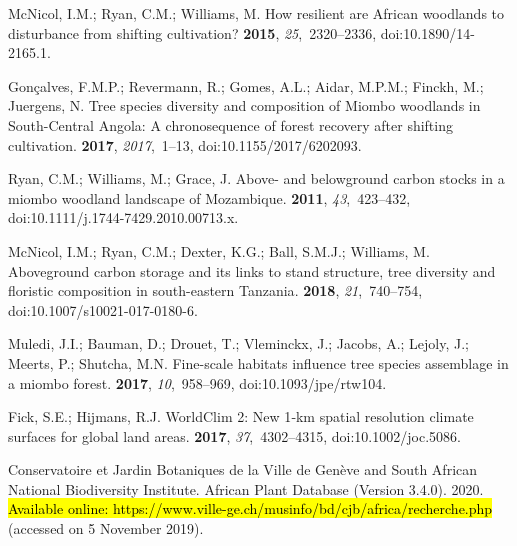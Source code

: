 \documentclass[diversity,article,accept,moreauthors,pdftex]{Definitions/mdpi}
\begin{document}
\begin{thebibliography}{999}
McNicol, I.M.; Ryan, C.M.; Williams, M.
\newblock How resilient are {African} woodlands to disturbance from shifting
  cultivation?
 {\bf 2015}, {\em 25},~2320--2336, doi:10.1890/14-2165.1.

Gon\c{c}alves, F.M.P.; Revermann, R.; Gomes, A.L.; Aidar, M.P.M.; Finckh, M.;
  Juergens, N.
\newblock Tree species diversity and composition of Miombo woodlands in
  South-Central Angola: {A} chronosequence of forest recovery after shifting
  cultivation.
 {\bf 2017}, {\em
  2017},~1--13, doi:10.1155/2017/6202093.

Ryan, C.M.; Williams, M.; Grace, J.
\newblock Above- and belowground carbon stocks in a miombo woodland landscape
  of {Mozambique}.
 {\bf 2011}, {\em 43},~423--432, doi:10.1111/j.1744-7429.2010.00713.x.

McNicol, I.M.; Ryan, C.M.; Dexter, K.G.; Ball, S.M.J.; Williams, M.
\newblock Aboveground carbon storage and its links to stand structure, tree
  diversity and floristic composition in south-eastern {Tanzania}.
 {\bf 2018}, {\em 21},~740--754, doi:10.1007/s10021-017-0180-6.

Muledi, J.I.; Bauman, D.; Drouet, T.; Vleminckx, J.; Jacobs, A.; Lejoly, J.;
  Meerts, P.; Shutcha, M.N.
\newblock Fine-scale habitats influence tree species assemblage in a miombo
  forest.
 {\bf 2017}, {\em 10},~958--969, doi:10.1093/jpe/rtw104.

Fick, S.E.; Hijmans, R.J.
\newblock WorldClim 2: {New} 1‐km spatial resolution climate surfaces for
  global land areas.
 {\bf 2017}, {\em
  37},~4302--4315, doi:10.1002/joc.5086.

Conservatoire et Jardin Botaniques de la Ville de Gen\`{e}ve and South African
  National Biodiversity Institute.
 African {Plant Database} (Version 3.4.0).  2020.
\hl{Available online: https://www.ville-ge.ch/musinfo/bd/cjb/africa/recherche.php} %
(accessed on 5 November 2019).


\end{thebibliography}
\end{document}
